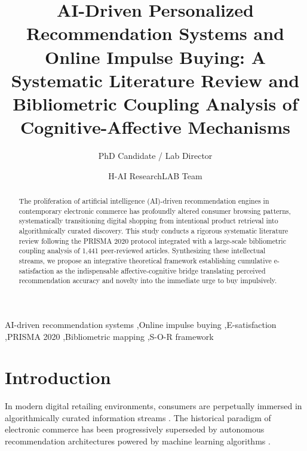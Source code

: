 \documentclass[preprint,12pt,authoryear]{elsarticle}
\begin{document}
\begin{frontmatter}

\title{AI-Driven Personalized Recommendation Systems and Online Impulse Buying: A Systematic Literature Review and Bibliometric Coupling Analysis of Cognitive-Affective Mechanisms}

\author[inst1]{PhD Candidate / Lab Director}

\author[inst1]{H-AI ResearchLAB Team}


\begin{abstract}
The proliferation of artificial intelligence (AI)-driven recommendation engines in contemporary electronic commerce has profoundly altered consumer browsing patterns, systematically transitioning digital shopping from intentional product retrieval into algorithmically curated discovery. This study conducts a rigorous systematic literature review following the PRISMA 2020 protocol integrated with a large-scale bibliometric coupling analysis of 1,441 peer-reviewed articles. Synthesizing these intellectual streams, we propose an integrative theoretical framework establishing cumulative e-satisfaction as the indispensable affective-cognitive bridge translating perceived recommendation accuracy and novelty into the immediate urge to buy impulsively.
\end{abstract}

\begin{keyword}
AI-driven recommendation systems \sep Online impulse buying \sep E-satisfaction \sep PRISMA 2020 \sep Bibliometric mapping \sep S-O-R framework
\end{keyword}

\end{frontmatter}

\section{Introduction}
In modern digital retailing environments, consumers are perpetually immersed in algorithmically curated information streams \citep{shanahan2019getting, xiao2018empirical}. The historical paradigm of electronic commerce has been progressively superseded by autonomous recommendation architectures powered by machine learning algorithms \citep{alnatour2011adoption, zhang2021personalized}.
\end{document}
